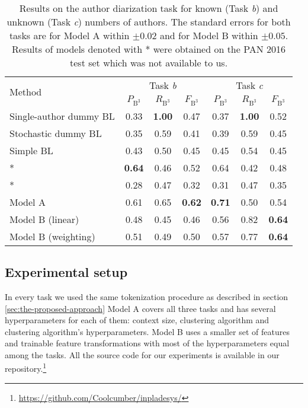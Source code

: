 \documentclass[10pt, a4paper]{article}
\begin{document}
\begin{table*}
	\caption{Results on the author diarization task for known (Task \emph{b}) and unknown (Task \emph{c}) numbers of authors. The standard errors for both tasks are for Model A within $\pm0.02$ and for Model B within $\pm0.05$. Results of models denoted with * were obtained on the PAN 2016 test set which was not available to us.}
	\label{tab:results-task-b-c}
	\begin{center}
		\begin{tabular}{l|ccc|ccc}
			\toprule
			\multirow{2}{*}{Method} & \multicolumn{3}{c|}{Task \emph{b}} & \multicolumn{3}{c}{Task \emph{c}} \\
			\cmidrule{2-7}
			& $P_{\mathrm{B}^3}$ & $R_{\mathrm{B}^3}$ & $F_{\mathrm{B}^3}$ & $P_{\mathrm{B}^3}$ & $R_{\mathrm{B}^3}$ & $F_{\mathrm{B}^3}$ \\
			\midrule
			Single-author dummy BL 		& 0.33 & \textbf{1.00} & 0.47 & 0.37 & \textbf{1.00} & 0.52 \\
			Stochastic dummy BL 		& 0.35 & 0.59 & 0.41 & 0.39 & 0.59 & 0.45 \\
			Simple BL 					& 0.43 & 0.50 & 0.45 & 0.45 & 0.54 & 0.45 \\
			\midrule
			\citet{kuznetsov-2016}*		& \textbf{0.64} & 0.46 & 0.52 & 0.64 & 0.42 & 0.48 \\
			\citet{sittar-2016}* 		& 0.28 & 0.47 & 0.32 & 0.31 & 0.47 & 0.35 \\
			\midrule			
			Model A 					& 0.61 & 0.65 & \textbf{0.62} & \textbf{0.71} & 0.50 & 0.54 \\			
			Model B (linear) 			& 0.48 & 0.45 & 0.46 & 0.56 & 0.82 & \textbf{0.64} \\
			Model B (weighting)			& 0.51 & 0.49 & 0.50 & 0.57 & 0.77 & \textbf{0.64} \\
			\bottomrule
		\end{tabular}
	\end{center}
\end{table*}

\subsection{Experimental setup}

In every task we used the same tokenization procedure as described in section \ref{sec:the-proposed-approach} Model A covers all three tasks and has several hyperparameters for each of them: context size, clustering algorithm and clustering algorithm's hyperparameters. Model B uses a smaller set of features and trainable feature transformations with most of the hyperparameters equal among the tasks. All the source code for our experiments is available in our repository.\footnote{\url{https://github.com/Coolcumber/inpladesys/}}
\end{document}
